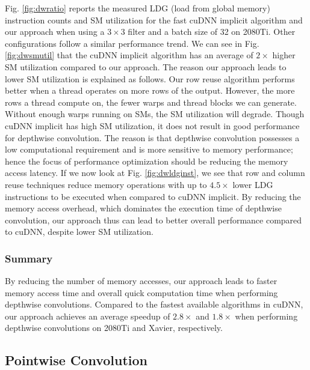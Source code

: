 Fig. \ref{fig:dwratio} reports the measured LDG (load from global memory) instruction counts and SM utilization for the fast cuDNN implicit
algorithm and our approach when using a $3 \times 3$ filter and a batch size of 32 on 2080Ti. Other configurations follow a similar
performance trend. We can see in Fig. \ref{fig:dwsmutil} that the cuDNN implicit algorithm has an average of $2\times$ higher SM
utilization compared to our approach. The reason our approach leads to lower SM utilization is explained as follows. Our row reuse
algorithm performs better when a thread operates on more rows of the output. However, the more rows a thread compute on, the fewer warps
and thread blocks we can generate. Without enough warps running on SMs, the SM utilization will degrade. Though cuDNN implicit has high SM
utilization, it does not result in good performance for depthwise convolution. The reason is that depthwise convolution possesses a low
computational requirement and is more sensitive to memory performance; hence the focus of performance optimization should be reducing the
memory access latency.  If we now look at Fig. \ref{fig:dwldginst}, we see that row and column reuse techniques reduce memory operations
with up to $4.5\times$ lower LDG instructions to be executed when compared to cuDNN implicit. By reducing the memory access overhead, which
dominates the execution time of depthwise convolution, our approach thus can lead to better overall performance compared to cuDNN, despite
lower SM utilization.

\subsubsection{Summary}
By reducing the number of memory accesses, our approach leads to faster memory access time and overall quick computation time when
performing depthwise convolutions. Compared to the fastest available algorithms in cuDNN, our approach achieves an average speedup of
$2.8\times$ and $1.8\times$ when performing depthwise convolutions on 2080Ti and Xavier, respectively.


\subsection{Pointwise Convolution}
\label{sec:pwconvexp}

